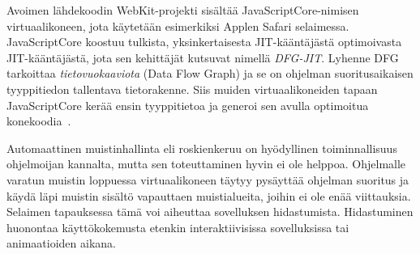 Avoimen lähdekoodin WebKit-projekti sisältää JavaScriptCore-nimisen virtuaalikoneen, jota käytetään esimerkiksi Applen Safari selaimessa. Java\-Script\-Core koostuu tulkista, yksinkertaisesta JIT-kääntäjästä optimoivasta JIT-kääntäjästä, jota sen kehittäjät kutsuvat nimellä \textit{DFG-JIT}. Lyhenne DFG tarkoittaa \textit{tietovuokaaviota} (Data Flow Graph) ja se on ohjelman suoritusaikaisen tyyppitiedon tallentava tietorakenne. Siis muiden virtuaalikoneiden tapaan JavaScriptCore kerää ensin tyyppitietoa ja generoi sen avulla optimoitua konekoodia~\cite{javascriptcore}.

Automaattinen muistinhallinta eli roskienkeruu on hyödyllinen toiminnallisuus ohjelmoijan kannalta, mutta sen toteuttaminen hyvin ei ole helppoa. Ohjelmalle varatun muistin loppuessa virtuaalikoneen täytyy pysäyttää ohjelman suoritus ja käydä läpi muistin sisältö vapauttaen muistialueita, joihin ei ole enää viittauksia. Selaimen tapauksessa tämä voi aiheuttaa sovelluksen hidastumista. Hidastuminen huonontaa käyttökokemusta etenkin interaktiivisissa sovelluksissa tai animaatioiden aikana.
